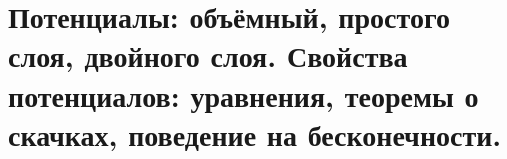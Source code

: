 \chapter{Потенциалы: объёмный, простого слоя, двойного слоя. Свойства потенциалов: уравнения, теоремы о скачках, поведение на бесконечности.}
\label{cha:20}




